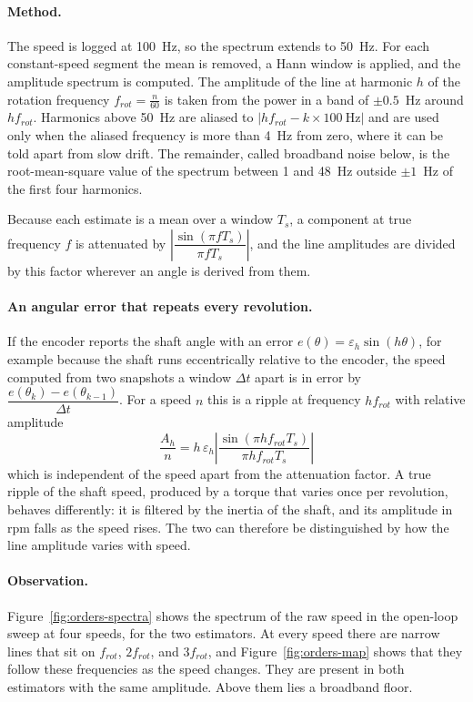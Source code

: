 \paragraph{Method.}
The speed is logged at 100~Hz, so the spectrum extends to 50~Hz. For each constant-speed segment the mean is removed, a Hann window is applied, and the amplitude spectrum is computed. The amplitude of the line at harmonic $h$ of the rotation frequency $f_{rot} = \frac{n}{60}$ is taken from the power in a band of $\pm 0.5$~Hz around $h f_{rot}$. Harmonics above 50~Hz are aliased to $|h f_{rot} - k \times 100\ \text{Hz}|$ and are used only when the aliased frequency is more than 4~Hz from zero, where it can be told apart from slow drift. The remainder, called broadband noise below, is the root-mean-square value of the spectrum between 1 and 48~Hz outside $\pm 1$~Hz of the first four harmonics.

Because each estimate is a mean over a window $T_s$, a component at true frequency $f$ is attenuated by $\left|\dfrac{\sin(\pi f T_s)}{\pi f T_s}\right|$, and the line amplitudes are divided by this factor wherever an angle is derived from them.

\paragraph{An angular error that repeats every revolution.}
If the encoder reports the shaft angle with an error $e(\theta) = \varepsilon_h \sin(h\theta)$, for example because the shaft runs eccentrically relative to the encoder, the speed computed from two snapshots a window $\Delta t$ apart is in error by $\dfrac{e(\theta_k) - e(\theta_{k-1})}{\Delta t}$. For a speed $n$ this is a ripple at frequency $h f_{rot}$ with relative amplitude
\begin{equation}
    \frac{A_h}{n} = h\, \varepsilon_h \left| \frac{\sin(\pi h f_{rot} T_s)}{\pi h f_{rot} T_s} \right|
    \label{eq:ripple}
\end{equation}
which is independent of the speed apart from the attenuation factor. A true ripple of the shaft speed, produced by a torque that varies once per revolution, behaves differently: it is filtered by the inertia of the shaft, and its amplitude in rpm falls as the speed rises. The two can therefore be distinguished by how the line amplitude varies with speed.

\paragraph{Observation.}
Figure~\ref{fig:orders-spectra} shows the spectrum of the raw speed in the open-loop sweep at four speeds, for the two estimators. At every speed there are narrow lines that sit on $f_{rot}$, $2f_{rot}$, and $3f_{rot}$, and Figure~\ref{fig:orders-map} shows that they follow these frequencies as the speed changes. They are present in both estimators with the same amplitude. Above them lies a broadband floor.


